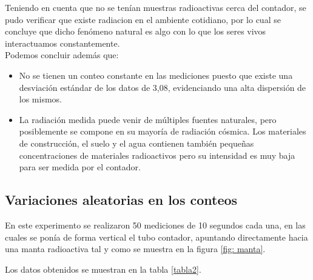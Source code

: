 \documentclass[prb,aps,twocolumn,preprintnumbers,amsmath,amssymb]{revtex4}
\begin{document}
Teniendo en cuenta que no se tenían muestras radioactivas cerca del contador, se pudo verificar que existe radiacion en el ambiente cotidiano, por lo cual se concluye que dicho fenómeno natural es algo con lo que los seres vivos interactuamos constantemente.\\

Podemos concluir además que:

\begin{itemize}
	\item No se tienen un conteo constante en las mediciones puesto que existe una desviación estándar de los datos de 3,08, evidenciando una alta dispersión de los mismos. 
	
	\item La radiación medida puede venir de múltiples fuentes naturales, pero posiblemente se compone en su mayoría de radiación cósmica. Los materiales de construcción, el suelo y el agua contienen también pequeñas concentraciones de materiales radioactivos pero su intensidad es muy baja para ser medida por el contador. 
\end{itemize}

\subsection{Variaciones aleatorias en los conteos}

En este experimento se realizaron 50 mediciones de 10 segundos cada una, en las cuales se ponía de forma vertical el tubo contador, apuntando directamente hacia una manta radioactiva tal y como se muestra en la figura \ref{fig: manta}.



Los datos obtenidos se muestran en la tabla \ref{tabla2}.\\
\end{document}
